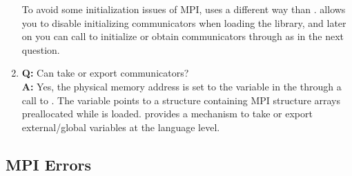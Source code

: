 \begin{enumerate}
      To avoid some initialization issues of MPI,  uses a
      different way than .  allows you to disable
      initializing communicators when loading the library, and later on you can
      call  to initialize or obtain communicators through
       as in the next question.

\item {\bf\color{blue} Q:}
      Can  take or export communicators? \\
      {\bf\color{blue} A:}
      Yes, the physical memory address is set to the variable
       in the  through a call to
      . The variable points to a structure containing MPI
      structure arrays preallocated while  is loaded.
       provides a mechanism to take or export
      external/global variables at the  language level.

\end{enumerate}




\subsection[MPI Errors]{MPI Errors}
\label{sec:mpi_errors}


